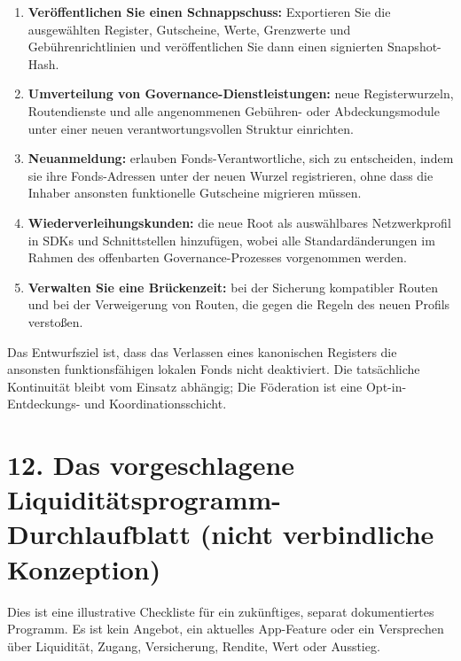 \documentclass[11pt]{article}
\begin{document}
\begin{enumerate}[leftmargin=*]
\item \textbf{Veröffentlichen Sie einen Schnappschuss:} Exportieren Sie die ausgewählten Register, Gutscheine, Werte, Grenzwerte und Gebührenrichtlinien und veröffentlichen Sie dann einen signierten Snapshot-Hash.
\item \textbf{Umverteilung von Governance-Dienstleistungen:} neue Registerwurzeln, Routendienste und alle angenommenen Gebühren- oder Abdeckungsmodule unter einer neuen verantwortungsvollen Struktur einrichten.
\item \textbf{Neuanmeldung:} erlauben Fonds-Verantwortliche, sich zu entscheiden, indem sie ihre Fonds-Adressen unter der neuen Wurzel registrieren, ohne dass die Inhaber ansonsten funktionelle Gutscheine migrieren müssen.
\item \textbf{Wiederverleihungskunden:} die neue Root als auswählbares Netzwerkprofil in SDKs und Schnittstellen hinzufügen, wobei alle Standardänderungen im Rahmen des offenbarten Governance-Prozesses vorgenommen werden.
\item \textbf{Verwalten Sie eine Brückenzeit:} bei der Sicherung kompatibler Routen und bei der Verweigerung von Routen, die gegen die Regeln des neuen Profils verstoßen.
\end{enumerate}
Das Entwurfsziel ist, dass das Verlassen eines kanonischen Registers die ansonsten funktionsfähigen lokalen Fonds nicht deaktiviert. Die tatsächliche Kontinuität bleibt vom Einsatz abhängig; Die Föderation ist eine Opt-in-Entdeckungs- und Koordinationsschicht.


\section*{12. Das vorgeschlagene Liquiditätsprogramm-Durchlaufblatt (nicht verbindliche Konzeption)}

Dies ist eine illustrative Checkliste für ein zukünftiges, separat dokumentiertes Programm. Es ist kein Angebot, ein aktuelles App-Feature oder ein Versprechen über Liquidität, Zugang, Versicherung, Rendite, Wert oder Ausstieg.
\end{document}
